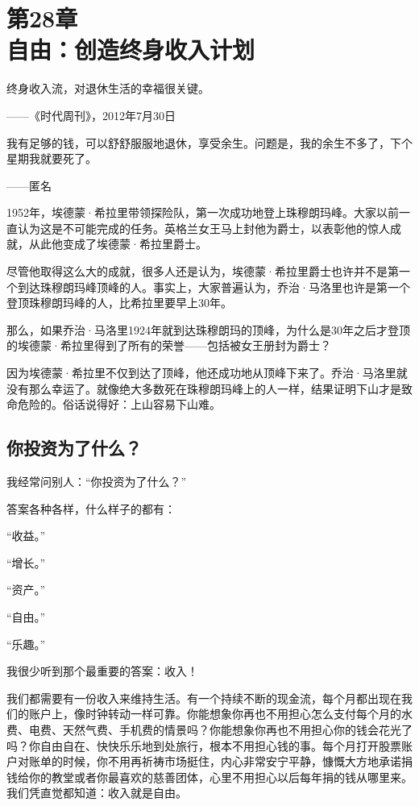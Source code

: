 
\section[第28章\q 自由：创造终身收入计划]{第28章\\ 自由：创造终身收入计划}

\begin{BookQuote}
终身收入流，对退休生活的幸福很关键。

\hfill ——《时代周刊》，2012年7月30日
\end{BookQuote}

\begin{BookQuote}
我有足够的钱，可以舒舒服服地退休，享受余生。问题是，我的余生不多了，下个星期我就要死了。

\hfill ——匿名
\end{BookQuote}

1952年，埃德蒙·希拉里带领探险队，第一次成功地登上珠穆朗玛峰。大家以前一直认为这是不可能完成的任务。英格兰女王马上封他为爵士，以表彰他的惊人成就，从此他变成了埃德蒙·希拉里爵士。

尽管他取得这么大的成就，很多人还是认为，埃德蒙·希拉里爵士也许并不是第一个到达珠穆朗玛峰顶峰的人。事实上，大家普遍认为，乔治·马洛里也许是第一个登顶珠穆朗玛峰的人，比希拉里要早上30年。

那么，如果乔治·马洛里1924年就到达珠穆朗玛的顶峰，为什么是30年之后才登顶的埃德蒙·希拉里得到了所有的荣誉——包括被女王册封为爵士？

因为埃德蒙·希拉里不仅到达了顶峰，他还成功地从顶峰下来了。乔治·马洛里就没有那么幸运了。就像绝大多数死在珠穆朗玛峰上的人一样，结果证明下山才是致命危险的。俗话说得好：上山容易下山难。

\subsection{你投资为了什么？}

我经常问别人：“你投资为了什么？”

答案各种各样，什么样子的都有：

“收益。”

“增长。”

“资产。”

“自由。”

“乐趣。”

我很少听到那个最重要的答案：收入！

我们都需要有一份收入来维持生活。有一个持续不断的现金流，每个月都出现在我们的账户上，像时钟转动一样可靠。你能想象你再也不用担心怎么支付每个月的水费、电费、天然气费、手机费的情景吗？你能想象你再也不用担心你的钱会花光了吗？你自由自在、快快乐乐地到处旅行，根本不用担心钱的事。每个月打开股票账户对账单的时候，你不用再祈祷市场挺住，内心非常安宁平静，慷慨大方地承诺捐钱给你的教堂或者你最喜欢的慈善团体，心里不用担心以后每年捐的钱从哪里来。我们凭直觉都知道：收入就是自由。

